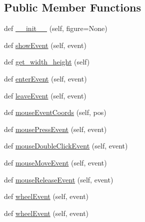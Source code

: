 \subsection*{Public Member Functions}
\begin{DoxyCompactItemize}
\item 
def \hyperlink{classmatplotlib_1_1backends_1_1backend__qt5_1_1FigureCanvasQT_a2ce85525004fd8a067bca92657ec6d21}{\+\_\+\+\_\+init\+\_\+\+\_\+} (self, figure=None)
\item 
def \hyperlink{classmatplotlib_1_1backends_1_1backend__qt5_1_1FigureCanvasQT_a2c28f0f893b69f19c050858935af9523}{show\+Event} (self, event)
\item 
def \hyperlink{classmatplotlib_1_1backends_1_1backend__qt5_1_1FigureCanvasQT_a3221e25689fbdf344288e37a8792c9d0}{get\+\_\+width\+\_\+height} (self)
\item 
def \hyperlink{classmatplotlib_1_1backends_1_1backend__qt5_1_1FigureCanvasQT_a26c56b22e1a5cc4a3130f7f2d124dab4}{enter\+Event} (self, event)
\item 
def \hyperlink{classmatplotlib_1_1backends_1_1backend__qt5_1_1FigureCanvasQT_a04beb3399225eea83a7b750308847252}{leave\+Event} (self, event)
\item 
def \hyperlink{classmatplotlib_1_1backends_1_1backend__qt5_1_1FigureCanvasQT_aaa0e49bf08501fe013cd742700a795d4}{mouse\+Event\+Coords} (self, pos)
\item 
def \hyperlink{classmatplotlib_1_1backends_1_1backend__qt5_1_1FigureCanvasQT_a45794e8fe4809c87cd0bc3dade4cb812}{mouse\+Press\+Event} (self, event)
\item 
def \hyperlink{classmatplotlib_1_1backends_1_1backend__qt5_1_1FigureCanvasQT_a9e09f3aee38c0fc3e316bab1d14a38b6}{mouse\+Double\+Click\+Event} (self, event)
\item 
def \hyperlink{classmatplotlib_1_1backends_1_1backend__qt5_1_1FigureCanvasQT_addf37d4326acb407c4a1fca42129df0d}{mouse\+Move\+Event} (self, event)
\item 
def \hyperlink{classmatplotlib_1_1backends_1_1backend__qt5_1_1FigureCanvasQT_a62547184c8434c409152099dd1e185ba}{mouse\+Release\+Event} (self, event)
\item 
def \hyperlink{classmatplotlib_1_1backends_1_1backend__qt5_1_1FigureCanvasQT_a692bca451173b31d132878fbaff4e3e2}{wheel\+Event} (self, event)
\item 
def \hyperlink{classmatplotlib_1_1backends_1_1backend__qt5_1_1FigureCanvasQT_a692bca451173b31d132878fbaff4e3e2}{wheel\+Event} (self, event)
\item 

\end{DoxyCompactItemize}
